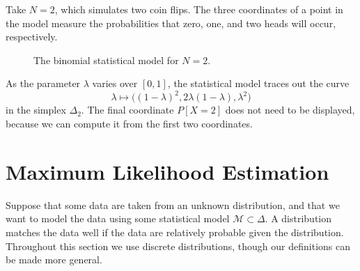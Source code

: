 \documentclass[cclicense]{hmcthesis}
\newcommand*{\Mod}{\mathcal{M}}
\numberwithin{equation}{section}
\begin{document}
\begin{example}
    Take $N=2$, which simulates two coin flips.  The three coordinates of a
    point in the model measure the probabilities that zero, one, and two heads
    will occur, respectively.
    \begin{figure}[H]\label{fig:binomial}
        \centering
        \vspace*{-0.2cm}
        \vspace*{-0.5cm}
        \caption{The binomial statistical model for $N=2$.}
    \end{figure}
    \noindent As the parameter $\lambda$ varies over $[0,1]$, the statistical
    model traces out the curve 
    \[
        \lambda \longmapsto \big((1-\lambda)^2, 2\lambda(1-\lambda), \lambda^2\big)
    \]
    in the simplex $\Delta_2$.  The final coordinate
    $P[X=2]$ does not need to be displayed, because we can compute it from the
    first two coordinates.  
    \end{example}
    
\section{Maximum Likelihood Estimation}

    Suppose that some data are taken from an unknown distribution, and that we
    want to model the data using some statistical model $\Mod \subset \Delta$.
    A distribution matches the data well if the data are relatively probable
    given the distribution.  Throughout this section we use discrete
    distributions, though our definitions can be made more general.
\end{document}
